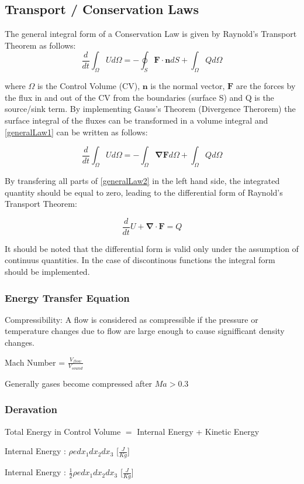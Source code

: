 \documentclass{article}
\begin{document}
	\subsection{Transport / Conservation Laws}
	
				\noindent The general integral form of a Conservation Law is given by Raynold's Transport Theorem as follows:
		\begin{equation} \label{generalLaw1}
			\frac{d}{dt} \int_\Omega U d \Omega = -\oint_S \boldsymbol{F} \cdot \boldsymbol{n} dS +
			\int_\Omega Q d\Omega
		\end{equation}
		
		\noindent where $\Omega$ is the Control Volume (CV), $\boldsymbol{n}$ is the normal vector, $\boldsymbol{F}$ are the forces by the flux in and out of the CV from the boundaries (surface S) and Q is the source/sink term. By implementing Gauss's Theorem (Divergence Therorem) the surface integral of the fluxes can be transformed in a volume integral and \eqref{generalLaw1} can be written as follows:
		
		\begin{equation} \label{generalLaw2}
			\frac{d}{dt} \int_\Omega U d \Omega = -\int_\Omega \boldsymbol{\nabla F} d \Omega +
			\int_\Omega Q d\Omega
		\end{equation}
	
		\noindent By transfering all parts of \eqref{generalLaw2} in the left hand side, the integrated quantity should be equal to zero, leading to the differential form of Raynold's Transport Theorem:
		
		\begin{equation} \label{generalLaw3}
			\frac{d}{dt}  U  + \boldsymbol{\nabla \cdot F}  = Q 
		\end{equation}
	
		\noindent It should be noted that the differential form is valid only under the assumption of continuus quantities. In the case of discontinous functions the integral form should be implemented.
	
			
	
			\subsubsection{Energy Transfer Equation}
				Compressibility: A flow is considered as compressible if the pressure or temperature changes due to flow are large enough to cause signifficant density changes.
				
				Mach Number = $\frac{V_{flow}}{V_{sound}}$
				
				Generally gases become compressed after $Ma>0.3$
				\subsubsection{Deravation}
				
				Total Energy in Control Volume $=$ Internal Energy + Kinetic Energy
				
				\noindent Internal Energy : $\rho e dx_1 dx_2 dx_3$  [$\frac{J}{Kg}$]
			
				\noindent Internal Energy : $ \frac{1}{2} \rho e dx_1 dx_2 dx_3$  [$\frac{J}{Kg}$]	
\end{document}
